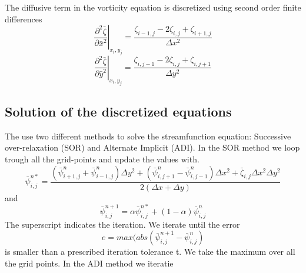 The diffusive term in the vorticity equation is discretized using second order finite differences\begin{equation}
\left. \frac{\partial^2 \bar{\zeta}}{\partial \bar{x}^2}\right|_{x_i,y_j} = \frac{\zeta_{i-1,j} - 2 \zeta_{i,j} + \zeta_{i+1,j}}{\Delta x^2}
\end{equation}
\begin{equation}
\left. \frac{\partial^2 \bar{\zeta}}{\partial \bar{y}^2}\right|_{x_i,y_j} = \frac{\zeta_{i,j-1} - 2 \zeta_{i,j} + \zeta_{i,j+1}}{\Delta y^2}
\end{equation}
\subsection{Solution of the discretized equations}
The use two different methods to solve the streamfunction equation: Successive over-relaxation (SOR) and Alternate Implicit (ADI). In the SOR method we loop trough all the grid-points and update the values with.
\begin{equation}
\bar{\psi}_{i,j}^{n*} = \frac{(\bar{\psi}^n_{i+1,j} + \bar{\psi}^n_{i-1,j}) \Delta y^2 +
(\bar{\psi}^n_{i,j+1} - \bar{\psi}^n_{i,j-1}) \Delta x^2 + \bar{\zeta}_{i,j} \Delta x^2 \Delta y^2}{2 (\Delta x + \Delta y)}
\end{equation}
and 
\begin{equation}
\bar{\psi}^{n+1}_{i,j} = \alpha \bar{\psi}_{i,j}^{n*} + (1-\alpha) \bar{\psi}^n_{i,j}
\end{equation}
The superscript indicates the iteration. We iterate until the error
\begin{equation}
e = max(abs(\bar{\psi}^{n+1}_{i,j} - \bar{\psi}^n_{i,j})
\end{equation}
is smaller than a prescribed iteration tolerance t.                                                                                                                                                                        We take the maximum over all the grid points.
In the ADI method we iteratie